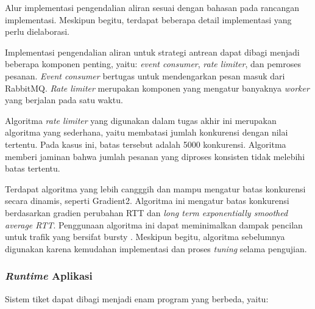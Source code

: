 Alur implementasi pengendalian aliran sesuai dengan bahasan pada rancangan implementasi. Meskipun begitu, terdapat beberapa detail implementasi yang perlu dielaborasi.

Implementasi pengendalian aliran untuk strategi antrean dapat dibagi menjadi beberapa komponen penting, yaitu: \textit{event consumer}, \textit{rate limiter}, dan pemroses pesanan. \textit{Event consumer} bertugas untuk mendengarkan pesan masuk dari RabbitMQ. \textit{Rate limiter} merupakan komponen yang mengatur banyaknya \textit{worker} yang berjalan pada satu waktu.

Algoritma \textit{rate limiter} yang digunakan dalam tugas akhir ini merupakan algoritma yang sederhana, yaitu membatasi jumlah konkurensi dengan nilai tertentu. Pada kasus ini, batas tersebut adalah 5000 konkurensi. Algoritma memberi jaminan bahwa jumlah pesanan yang diproses konsisten tidak melebihi batas tertentu.

Terdapat algoritma yang lebih cangggih dan mampu mengatur batas konkurensi secara dinamis, seperti Gradient2. Algoritma ini mengatur batas konkurensi berdasarkan gradien perubahan RTT dan \textit{long term exponentially smoothed average RTT}. Penggunaan algoritma ini dapat meminimalkan dampak pencilan untuk trafik yang bersifat bursty \parencite{platinummonkey_go_concurrency_limits}. Meskipun begitu, algoritma sebelumnya digunakan karena kemudahan implementasi dan proses \textit{tuning} selama pengujian.

\subsubsection{\textit{Runtime} Aplikasi}

Sistem tiket dapat dibagi menjadi enam program yang berbeda, yaitu:

